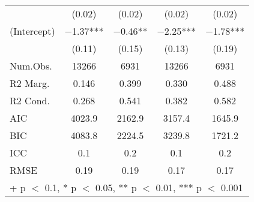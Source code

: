 \begin{longtable}{lcccc}
 & (\num{0.02}) & (\num{0.02}) & (\num{0.02}) & (\num{0.02})\\
(Intercept) & \num{-1.37}*** & \num{-0.46}** & \num{-2.25}*** & \num{-1.78}***\\
 & (\num{0.11}) & (\num{0.15}) & (\num{0.13}) & (\num{0.19})\\
\midrule
Num.Obs. & \num{13266} & \num{6931} & \num{13266} & \num{6931}\\
R2 Marg. & \num{0.146} & \num{0.399} & \num{0.330} & \num{0.488}\\
R2 Cond. & \num{0.268} & \num{0.541} & \num{0.382} & \num{0.582}\\
AIC & \num{4023.9} & \num{2162.9} & \num{3157.4} & \num{1645.9}\\
BIC & \num{4083.8} & \num{2224.5} & \num{3239.8} & \num{1721.2}\\
ICC & \num{0.1} & \num{0.2} & \num{0.1} & \num{0.2}\\
RMSE & \num{0.19} & \num{0.19} & \num{0.17} & \num{0.17}\\
\bottomrule
\multicolumn{5}{l}{\rule{0pt}{1em}+ p $<$ 0.1, * p $<$ 0.05, ** p $<$ 0.01, *** p $<$ 0.001}\\
\end{longtable}